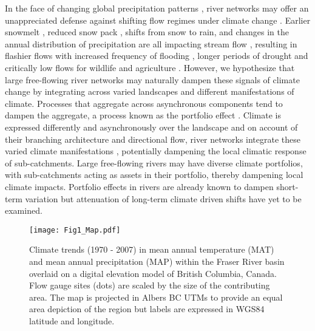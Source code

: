 \documentclass[draft,linenumbers]{AGUJournal}
\begin{document}
	In the face of changing global precipitation patterns \citep{Donat:2016}, river networks may offer an unappreciated defense against shifting flow regimes under climate change \citep{Hartmann:2013,Palmer:2009}. Earlier snowmelt \citep{Rauscher:2008}, reduced snow pack \citep{McCabe:2014}, shifts from snow to rain, and changes in the annual distribution of precipitation are all impacting stream flow \citep{Hartmann:2013}, resulting in flashier flows with increased frequency of flooding \citep{Hirabayashi:2013}, longer periods of drought and critically low flows for wildlife and agriculture \citep{Melillo:2014}. However, we hypothesize that large free-flowing river networks may naturally dampen these signals of climate change by integrating across varied landscapes and different manifestations of climate. Processes that aggregate across asynchronous components tend to dampen the aggregate, a process known as the portfolio effect \citep{Doak:1998}. Climate is expressed differently and asynchronously over the landscape \citep [e.g.,][]{Wang:2012} and on account of their branching architecture and directional flow, river networks integrate these varied climate manifestations \citep{Peterson:2013}, potentially dampening the local climatic response of sub-catchments. Large free-flowing rivers may have diverse climate portfolios, with sub-catchments acting as assets in their portfolio, thereby dampening local climate impacts. Portfolio effects in rivers are already known to dampen short-term variation \citep{Moore:2015,Yeakel:2014} but attenuation of long-term climate driven shifts have yet to be examined.

\begin{figure}[h]
\centering
\texttt{[image: Fig1\_Map.pdf]}
	\caption{Climate trends (1970 - 2007) in mean annual temperature (MAT) and mean annual precipitation (MAP) within the Fraser River basin overlaid on a digital elevation model of British Columbia, Canada. Flow gauge sites (dots) are scaled by the size of the contributing area. The map is projected in Albers BC UTMs to provide an equal area depiction of the region but labels are expressed in WGS84 latitude and longitude.}
\label{fig:1}
\end{figure}
\end{document}
